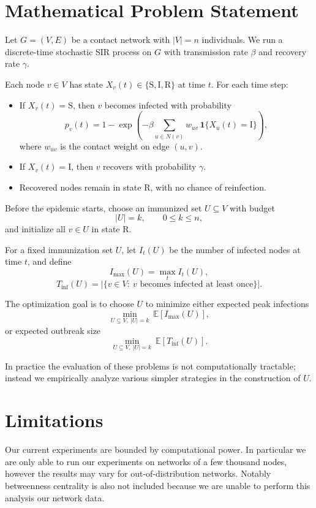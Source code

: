 \documentclass[9pt,twocolumn]{pnas-new}
\begin{document}
\section*{Mathematical Problem Statement}

Let $G=(V,E)$ be a contact network with $|V|=n$ individuals. We run a discrete-time stochastic SIR process on $G$ with transmission rate $\beta$ and recovery rate $\gamma$.

Each node $v\in V$ has state $X_v(t)\in\{\mathrm{S},\mathrm{I},\mathrm{R}\}$ at time $t$. For each time step:
\begin{itemize}
    \item If $X_v(t)=\mathrm{S}$, then $v$ becomes infected with probability
    \[
    p_v(t)=1-\exp\!\left(-\beta\sum_{u\in N(v)} w_{uv}\,\mathbf{1}\{X_u(t)=\mathrm{I}\}\right),
    \]
    where $w_{uv}$ is the contact weight on edge $(u,v)$.
    \item If $X_v(t)=\mathrm{I}$, then $v$ recovers with probability $\gamma$.
    \item Recovered nodes remain in state $\mathrm{R}$, with no chance of reinfection.
\end{itemize}

Before the epidemic starts, choose an immunized set $U\subseteq V$ with budget
\[
|U|=k, \qquad 0\le k\le n,
\]
and initialize all $v\in U$ in state $\mathrm{R}$.

For a fixed immunization set $U$, let $I_t(U)$ be the number of infected nodes at time $t$, and define
\[
I_{\max}(U)=\max_t I_t(U),
\]
\[
T_{\mathrm{inf}}(U)=\left|\{v\in V:\ v\text{ becomes infected at least once}\}\right|.
\]

The optimization goal is to choose $U$ to minimize either expected peak infections
\[
\min_{U\subseteq V,\ |U|=k} \ \mathbb{E}[I_{\max}(U)],
\]
or expected outbreak size
\[
\min_{U\subseteq V,\ |U|=k} \ \mathbb{E}[T_{\mathrm{inf}}(U)].
\]

In practice the evaluation of these problems is not computationally tractable; instead we empirically analyze various simpler strategies in the construction of $U$.

\section*{Limitations}
Our current experiments are bounded by computational power. In particular we are only able to run our experiments on networks of a few thousand nodes, however the results may vary for out-of-distribution networks. Notably betweenness centrality is also not included because we are unable to perform this analysis our network data. 
\end{document}
